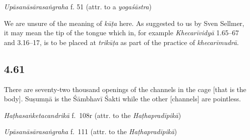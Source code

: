\begin{ekdosis}

\begin{testimonia}[hp04_060]
\emph{Upāsanāsārasaṅgraha} f. 51 (attr. to a \emph{yogaśāstra})
\begin{versinnote}
\end{versinnote}
\end{testimonia}

\begin{philcomm}[hp04_060]
We are unsure of the meaning of \emph{kūṭa} here. As suggested to us by Sven Sellmer, it may mean the tip of the tongue which in, for example \emph{Khecarīvidyā} 1.65–67 and 3.16–17, is to be placed at \emph{trikūṭa} as part of the practice of \emph{khecarīmudrā}.
\end{philcomm}

\subsection*{4.61}
\begin{translation}[hp04_061]
There are seventy-two thousand openings  of the channels in the cage [that is the body]. Suṣumṇā is the Śāmbhavī Śakti while the other [channels] are pointless.
\end{translation}%


\begin{testimonia}[hp04_061]
\emph{Haṭhasaṅketacandrikā} f.~108r (attr. to the \emph{Haṭhapradīpikā})
\begin{versinnote}
\end{versinnote}

\emph{Upāsanāsārasaṅgraha} f.~111 (attr. to the \emph{Haṭhapradīpikā})
\begin{versinnote}
\end{versinnote}


\end{testimonia}
\end{ekdosis}
